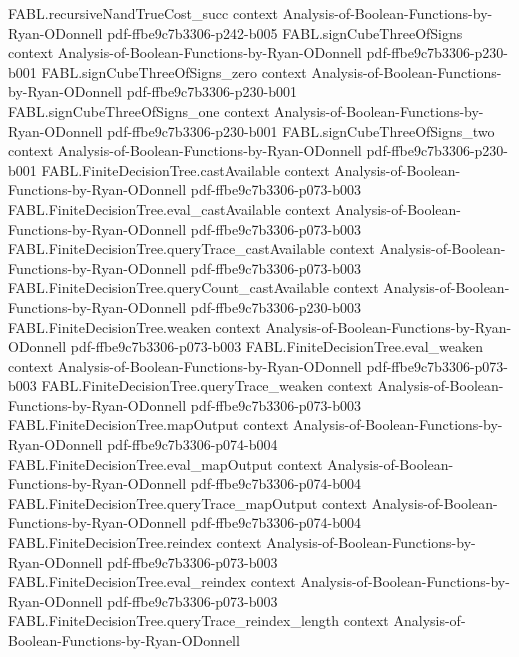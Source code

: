 \begin{theorem}
\proofstep
  {FABL.recursiveNandTrueCost_succ}
  {context}
  {Analysis-of-Boolean-Functions-by-Ryan-ODonnell}
  {pdf-ffbe9c7b3306-p242-b005}
\proofstep
  {FABL.signCubeThreeOfSigns}
  {context}
  {Analysis-of-Boolean-Functions-by-Ryan-ODonnell}
  {pdf-ffbe9c7b3306-p230-b001}
\proofstep
  {FABL.signCubeThreeOfSigns_zero}
  {context}
  {Analysis-of-Boolean-Functions-by-Ryan-ODonnell}
  {pdf-ffbe9c7b3306-p230-b001}
\proofstep
  {FABL.signCubeThreeOfSigns_one}
  {context}
  {Analysis-of-Boolean-Functions-by-Ryan-ODonnell}
  {pdf-ffbe9c7b3306-p230-b001}
\proofstep
  {FABL.signCubeThreeOfSigns_two}
  {context}
  {Analysis-of-Boolean-Functions-by-Ryan-ODonnell}
  {pdf-ffbe9c7b3306-p230-b001}
\proofstep
  {FABL.FiniteDecisionTree.castAvailable}
  {context}
  {Analysis-of-Boolean-Functions-by-Ryan-ODonnell}
  {pdf-ffbe9c7b3306-p073-b003}
\proofstep
  {FABL.FiniteDecisionTree.eval_castAvailable}
  {context}
  {Analysis-of-Boolean-Functions-by-Ryan-ODonnell}
  {pdf-ffbe9c7b3306-p073-b003}
\proofstep
  {FABL.FiniteDecisionTree.queryTrace_castAvailable}
  {context}
  {Analysis-of-Boolean-Functions-by-Ryan-ODonnell}
  {pdf-ffbe9c7b3306-p073-b003}
\proofstep
  {FABL.FiniteDecisionTree.queryCount_castAvailable}
  {context}
  {Analysis-of-Boolean-Functions-by-Ryan-ODonnell}
  {pdf-ffbe9c7b3306-p230-b003}
\proofstep
  {FABL.FiniteDecisionTree.weaken}
  {context}
  {Analysis-of-Boolean-Functions-by-Ryan-ODonnell}
  {pdf-ffbe9c7b3306-p073-b003}
\proofstep
  {FABL.FiniteDecisionTree.eval_weaken}
  {context}
  {Analysis-of-Boolean-Functions-by-Ryan-ODonnell}
  {pdf-ffbe9c7b3306-p073-b003}
\proofstep
  {FABL.FiniteDecisionTree.queryTrace_weaken}
  {context}
  {Analysis-of-Boolean-Functions-by-Ryan-ODonnell}
  {pdf-ffbe9c7b3306-p073-b003}
\proofstep
  {FABL.FiniteDecisionTree.mapOutput}
  {context}
  {Analysis-of-Boolean-Functions-by-Ryan-ODonnell}
  {pdf-ffbe9c7b3306-p074-b004}
\proofstep
  {FABL.FiniteDecisionTree.eval_mapOutput}
  {context}
  {Analysis-of-Boolean-Functions-by-Ryan-ODonnell}
  {pdf-ffbe9c7b3306-p074-b004}
\proofstep
  {FABL.FiniteDecisionTree.queryTrace_mapOutput}
  {context}
  {Analysis-of-Boolean-Functions-by-Ryan-ODonnell}
  {pdf-ffbe9c7b3306-p074-b004}
\proofstep
  {FABL.FiniteDecisionTree.reindex}
  {context}
  {Analysis-of-Boolean-Functions-by-Ryan-ODonnell}
  {pdf-ffbe9c7b3306-p073-b003}
\proofstep
  {FABL.FiniteDecisionTree.eval_reindex}
  {context}
  {Analysis-of-Boolean-Functions-by-Ryan-ODonnell}
  {pdf-ffbe9c7b3306-p073-b003}
\proofstep
  {FABL.FiniteDecisionTree.queryTrace_reindex_length}
  {context}
  {Analysis-of-Boolean-Functions-by-Ryan-ODonnell}

\end{theorem}
